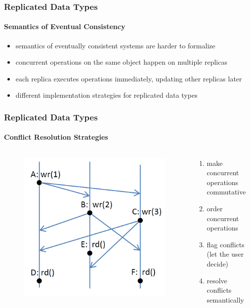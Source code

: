 \documentclass[11pt]{beamer}
\begin{document}
\begin{frame}
\frametitle{Replicated Data Types}
\framesubtitle{Semantics of Eventual Consistency}
\begin{itemize}
\item semantics of eventually consistent systems are harder to formalize
\item concurrent operations on the same object happen on multiple replicas
\item each replica executes operations immediately, updating other replicas later
\item different implementation strategies for replicated data types
\end{itemize}
\end{frame}

\begin{frame}
\frametitle{Replicated Data Types}
\framesubtitle{Conflict Resolution Strategies}
\begin{columns}
\begin{column}{5cm}
\begin{figure}
\includegraphics[scale=0.3]{update_replicas_highres.png}
\end{figure}
\end{column}
\begin{column}{5cm}
\pause
\begin{enumerate}
\item make concurrent operations commutative
\pause
\item order concurrent operations
\pause
\item flag conflicts (let the user decide)
\pause
\item resolve conflicts semantically
\end{enumerate}
\end{column}
\end{columns}
\end{frame}
\end{document}
